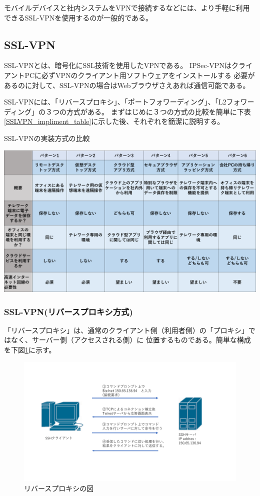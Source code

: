 \documentclass[11pt,a4j,titlepage]{jreport}
\begin{document}
モバイルデバイスと社内システムをVPNで接続するなどには、より手軽に利用できるSSL-VPNを使用するのが一般的である。


\subsection{SSL-VPN}
SSL-VPNとは、暗号化にSSL技術を使用したVPNである。
IPSec-VPNはクライアントPCに必ずVPNのクライアント用ソフトウェアをインストールする
必要があるのに対して、SSL-VPNの場合はWebブラウザさえあれば通信可能である。

SSL-VPNには、「リバースプロキシ」、「ポートフォワーディング」、「L2フォワーディング」の３つの方式がある。
まずはじめに３つの方式の比較を簡単に下表\ref{SSLVPN_impliment_table}に示した後、それぞれを簡潔に説明する。

\begin{table}[h]
    \centering
    \caption{SSL-VPNの実装方式の比較}
    \includegraphics[width=1.0\textwidth, page=3]{graphs/telework_list.pdf}
    \label{SSLVPN_impliment_table}
\end{table}

\subsubsection*{SSL-VPN(リバースプロキシ方式)}

「リバースプロキシ」は、通常のクライアント側（利用者側）の「プロキシ」ではなく、サーバー側（アクセスされる側）に
位置するものである。簡単な構成を下図\ref{reverse_proxy}に示す。

\begin{figure}[h]
    \centering
    \includegraphics[width=1.0\textwidth, page=16]{graphs/network_archtecture.pdf}
    \caption{リバースプロキシの図}
    \label{reverse_proxy}
\end{figure}
\end{document}
